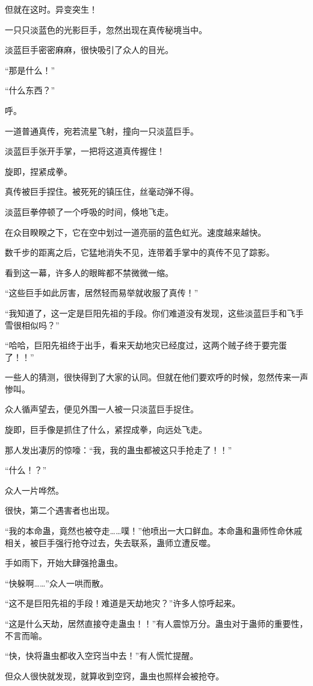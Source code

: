 \begin{this_body}
但就在这时。异变突生！

一只只淡蓝色的光影巨手，忽然出现在真传秘境当中。

淡蓝巨手密密麻麻，很快吸引了众人的目光。

“那是什么！”

“什么东西？”

呼。

一道普通真传，宛若流星飞射，撞向一只淡蓝巨手。

淡蓝巨手张开手掌，一把将这道真传握住！

旋即，捏紧成拳。

真传被巨手捏住。被死死的镇压住，丝毫动弹不得。

淡蓝巨拳停顿了一个呼吸的时间，倏地飞走。

在众目睽睽之下，它在空中划过一道亮丽的蓝色虹光。速度越来越快。

数千步的距离之后，它猛地消失不见，连带着手掌中的真传不见了踪影。

看到这一幕，许多人的眼眸都不禁微微一缩。

“这些巨手如此厉害，居然轻而易举就收服了真传！”

“我知道了，这一定是巨阳先祖的手段。你们难道没有发现，这些淡蓝巨手和飞手雪很相似吗？”

“哈哈，巨阳先祖终于出手，看来天劫地灾已经度过，这两个贼子终于要完蛋了！！”

一些人的猜测，很快得到了大家的认同。但就在他们要欢呼的时候，忽然传来一声惨叫。

众人循声望去，便见外围一人被一只淡蓝巨手捉住。

旋即，巨手像是抓住了什么，紧捏成拳，向远处飞走。

那人发出凄厉的惊嚎：“我，我的蛊虫都被这只手抢走了！！”

“什么！？”

众人一片哗然。

很快，第二个遇害者也出现。

“我的本命蛊，竟然也被夺走……噗！”他喷出一大口鲜血。本命蛊和蛊师性命休戚相关，被巨手强行抢夺过去，失去联系，蛊师立遭反噬。

手如雨下，开始大肆强抢蛊虫。

“快躲啊……”众人一哄而散。

“这不是巨阳先祖的手段！难道是天劫地灾？”许多人惊呼起来。

“这是什么天劫，居然直接夺走蛊虫！！”有人震惊万分。蛊虫对于蛊师的重要性，不言而喻。

“快，快将蛊虫都收入空窍当中去！”有人慌忙提醒。

但众人很快就发现，就算收到空窍，蛊虫也照样会被抢夺。


\end{this_body}
